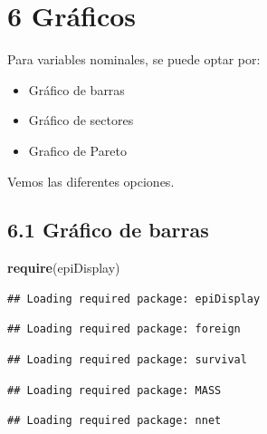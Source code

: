 \documentclass[
]{article}
\newenvironment{Shaded}{\begin{snugshade}}{\end{snugshade}}
\newcommand{\FunctionTok}[1]{\textcolor[rgb]{0.13,0.29,0.53}{\textbf{#1}}}
\newcommand{\NormalTok}[1]{#1}
\providecommand{\tightlist}{%
  \setlength{\itemsep}{0pt}\setlength{\parskip}{0pt}}
\begin{document}
\newpage

\hypertarget{gruxe1ficos}{%
\section{6 Gráficos}\label{gruxe1ficos}}

Para variables nominales, se puede optar por:

\begin{itemize}
\tightlist
\item
  Gráfico de barras
\item
  Gráfico de sectores
\item
  Grafico de Pareto
\end{itemize}

Vemos las diferentes opciones.

\hypertarget{gruxe1fico-de-barras}{%
\subsection{6.1 Gráfico de barras}\label{gruxe1fico-de-barras}}

\begin{Shaded}
\begin{Highlighting}[]
\FunctionTok{require}\NormalTok{(epiDisplay)}
\end{Highlighting}
\end{Shaded}

\begin{verbatim}
## Loading required package: epiDisplay
\end{verbatim}

\begin{verbatim}
## Loading required package: foreign
\end{verbatim}

\begin{verbatim}
## Loading required package: survival
\end{verbatim}

\begin{verbatim}
## Loading required package: MASS
\end{verbatim}

\begin{verbatim}
## Loading required package: nnet
\end{verbatim}
\end{document}
